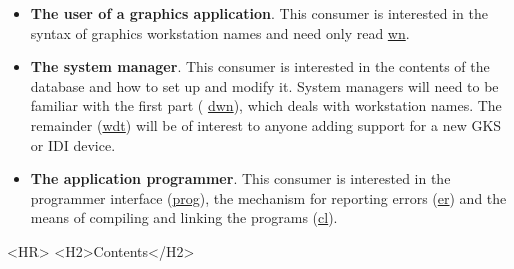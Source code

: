 \begin{itemize}

\item {\bf The user of a graphics application}. This consumer is interested in
the syntax of graphics workstation names and need only read 
\hyperref{this section}{section~}{}{wn}.

\item {\bf The system manager}. This consumer is interested in the contents
of the database and how to set up and modify it. System managers will need to
be familiar with the first part (
\hyperref{this section}{section~}{}{dwn}), which deals with
workstation names. The remainder 
(\hyperref{this section}{section~}{}{wdt}) will be of interest to
anyone adding support for a new GKS or IDI device.

\item {\bf The application programmer}. This consumer is interested in the
programmer interface 
(\hyperref{this appendix}{appendix~}{}{prog}), the mechanism for reporting
errors 
(\hyperref{this section}{section~}{}{er}) and the means of compiling and linking the
programs (\hyperref{this section}{section~}{}{cl}).

\end{itemize}

\newpage

%
\newcommand{\latexonlytoc}[0]{\tableofcontents}
\begin{htmlonly}
   \renewcommand{\latexonlytoc}[0]{}
  \label{stardoccontents}
  \begin{rawhtml} 
     <HR>
     <H2>Contents</H2>
  \end{rawhtml}
\end{htmlonly}
\begin{latexonly}
   \setlength{\parskip}{0mm}
   \latexonlytoc
   \setlength{\parskip}{\medskipamount}
   \markright{\stardocname}
\end{latexonly}
\newpage

